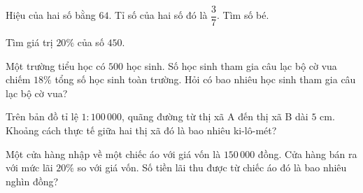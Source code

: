 \begin{ex} %
Hiệu của hai số bằng $64$. Tỉ số của hai số đó là $\dfrac{3}{7}$. Tìm số bé.
\end{ex}

\begin{ex} %
Tìm giá trị $20\%$ của số $450$.
\end{ex}

\begin{ex} %
Một trường tiểu học có $500$ học sinh. Số học sinh tham gia câu lạc bộ cờ vua chiếm $18\%$ tổng số học sinh toàn trường. Hỏi có bao nhiêu học sinh tham gia câu lạc bộ cờ vua?
\end{ex}

\begin{ex} %
Trên bản đồ tỉ lệ $1 : 100\,000$, quãng đường từ thị xã A đến thị xã B dài $5\text{ cm}$. Khoảng cách thực tế giữa hai thị xã đó là bao nhiêu ki-lô-mét?
\end{ex}

\begin{ex} %
Một cửa hàng nhập về một chiếc áo với giá vốn là $150\,000$ đồng. Cửa hàng bán ra với mức lãi $20\%$ so với giá vốn. Số tiền lãi thu được từ chiếc áo đó là bao nhiêu nghìn đồng?
\end{ex}
